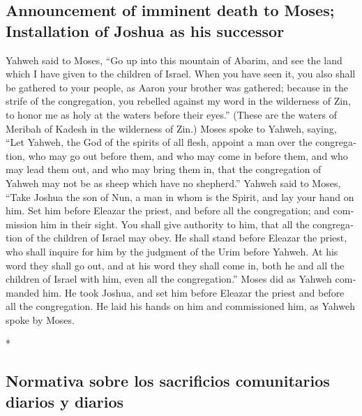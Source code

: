 \begin{paracol}{2}
\begin{otherlanguage}{english}
\hypertarget{announcement-of-imminent-death-to-moses-installation-of-joshua-as-his-successor}{%
\subsection{Announcement of imminent death to Moses; Installation of
Joshua as his
successor}\label{announcement-of-imminent-death-to-moses-installation-of-joshua-as-his-successor}}

 Yahweh said to Moses, ``Go up into this mountain of
Abarim, and see the land which I have given to the children of Israel.
 When you have seen it, you also shall be gathered to
your people, as Aaron your brother was gathered;  because
in the strife of the congregation, you rebelled against my word in the
wilderness of Zin, to honor me as holy at the waters before their
eyes.'' (These are the waters of Meribah of Kadesh in the wilderness of
Zin.)  Moses spoke to Yahweh, saying, 
``Let Yahweh, the God of the spirits of all flesh, appoint a man over
the congregation,  who may go out before them, and who
may come in before them, and who may lead them out, and who may bring
them in, that the congregation of Yahweh may not be as sheep which have
no shepherd.''  Yahweh said to Moses, ``Take Joshua the
son of Nun, a man in whom is the Spirit, and lay your hand on him.
 Set him before Eleazar the priest, and before all the
congregation; and commission him in their sight.  You
shall give authority to him, that all the congregation of the children
of Israel may obey.  He shall stand before Eleazar the
priest, who shall inquire for him by the judgment of the Urim before
Yahweh. At his word they shall go out, and at his word they shall come
in, both he and all the children of Israel with him, even all the
congregation.''  Moses did as Yahweh commanded him. He
took Joshua, and set him before Eleazar the priest and before all the
congregation.  He laid his hands on him and commissioned
him, as Yahweh spoke by Moses.

\end{otherlanguage}

\switchcolumn[0]*

\hypertarget{normativa-sobre-los-sacrificios-comunitarios-diarios-y-diarios}{%
\subsection{Normativa sobre los sacrificios comunitarios diarios y
diarios}\label{normativa-sobre-los-sacrificios-comunitarios-diarios-y-diarios}}


\end{paracol}
